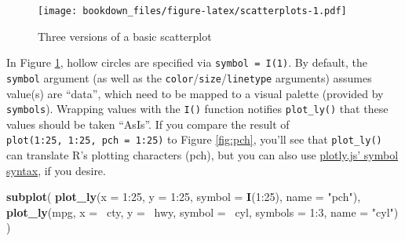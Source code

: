 \documentclass[12pt,]{isuthesis}
\newenvironment{Shaded}{\begin{snugshade}}{\end{snugshade}}
\newcommand{\KeywordTok}[1]{\textcolor[rgb]{0.13,0.29,0.53}{\textbf{{#1}}}}
\newcommand{\DataTypeTok}[1]{\textcolor[rgb]{0.13,0.29,0.53}{{#1}}}
\newcommand{\DecValTok}[1]{\textcolor[rgb]{0.00,0.00,0.81}{{#1}}}
\newcommand{\FloatTok}[1]{\textcolor[rgb]{0.00,0.00,0.81}{{#1}}}
\newcommand{\StringTok}[1]{\textcolor[rgb]{0.31,0.60,0.02}{{#1}}}
\newcommand{\NormalTok}[1]{{#1}}
\begin{document}
\begin{Shaded}
\end{Shaded}

\begin{figure}[htbp]
\centering
\texttt{[image: bookdown\_files/figure-latex/scatterplots-1.pdf]}
\caption{\label{fig:scatterplots}Three versions of a basic scatterplot}
\end{figure}

In Figure \ref{fig:scatterplots}, hollow circles are specified via
\texttt{symbol\ =\ I(1)}. By default, the \texttt{symbol} argument (as
well as the \texttt{color}/\texttt{size}/\texttt{linetype} arguments)
assumes value(s) are ``data'', which need to be mapped to a visual
palette (provided by \texttt{symbols}). Wrapping values with the
\texttt{I()} function notifies \texttt{plot\_ly()} that these values
should be taken ``AsIs''. If you compare the result of
\texttt{plot(1:25,\ 1:25,\ pch\ =\ 1:25)} to Figure \ref{fig:pch},
you'll see that \texttt{plot\_ly()} can translate R's plotting
characters (pch), but you can also use
\href{https://plot.ly/r/reference/\#scatter-marker-symbol}{plotly.js'
symbol syntax}, if you desire.

\begin{Shaded}
\begin{Highlighting}[]
\KeywordTok{subplot}\NormalTok{(}
  \KeywordTok{plot_ly}\NormalTok{(}\DataTypeTok{x =} \DecValTok{1}\NormalTok{:}\DecValTok{25}\NormalTok{, }\DataTypeTok{y =} \DecValTok{1}\NormalTok{:}\DecValTok{25}\NormalTok{, }\DataTypeTok{symbol =} \KeywordTok{I}\NormalTok{(}\DecValTok{1}\NormalTok{:}\DecValTok{25}\NormalTok{), }\DataTypeTok{name =} \StringTok{"pch"}\NormalTok{),}
  \KeywordTok{plot_ly}\NormalTok{(mpg, }\DataTypeTok{x =} \NormalTok{~cty, }\DataTypeTok{y =} \NormalTok{~hwy, }\DataTypeTok{symbol =} \NormalTok{~cyl, }\DataTypeTok{symbols =} \DecValTok{1}\NormalTok{:}\DecValTok{3}\NormalTok{, }\DataTypeTok{name =} \StringTok{"cyl"}\NormalTok{)}
\NormalTok{)}
\end{Highlighting}
\end{Shaded}
\end{document}
